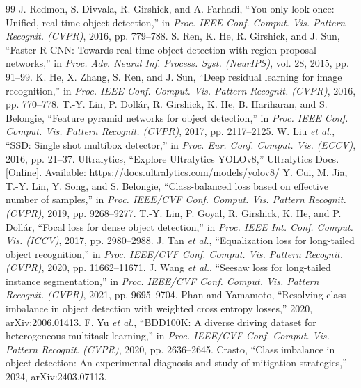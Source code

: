 \documentclass[10pt,journal,letterpaper]{IEEEtran}
\begin{document}
\begin{thebibliography}{99}
 J. Redmon, S. Divvala, R. Girshick, and A. Farhadi, ``You only look once: Unified, real-time object detection,'' in \textit{Proc. IEEE Conf. Comput. Vis. Pattern Recognit. (CVPR)}, 2016, pp. 779--788.
 S. Ren, K. He, R. Girshick, and J. Sun, ``Faster R-CNN: Towards real-time object detection with region proposal networks,'' in \textit{Proc. Adv. Neural Inf. Process. Syst. (NeurIPS)}, vol. 28, 2015, pp. 91--99.
 K. He, X. Zhang, S. Ren, and J. Sun, ``Deep residual learning for image recognition,'' in \textit{Proc. IEEE Conf. Comput. Vis. Pattern Recognit. (CVPR)}, 2016, pp. 770--778.
 T.-Y. Lin, P. Doll\'ar, R. Girshick, K. He, B. Hariharan, and S. Belongie, ``Feature pyramid networks for object detection,'' in \textit{Proc. IEEE Conf. Comput. Vis. Pattern Recognit. (CVPR)}, 2017, pp. 2117--2125.
 W. Liu \textit{et al.}, ``SSD: Single shot multibox detector,'' in \textit{Proc. Eur. Conf. Comput. Vis. (ECCV)}, 2016, pp. 21--37.
 Ultralytics, ``Explore Ultralytics YOLOv8,'' Ultralytics Docs. [Online]. Available: https://docs.ultralytics.com/models/yolov8/
 Y. Cui, M. Jia, T.-Y. Lin, Y. Song, and S. Belongie, ``Class-balanced loss based on effective number of samples,'' in \textit{Proc. IEEE/CVF Conf. Comput. Vis. Pattern Recognit. (CVPR)}, 2019, pp. 9268--9277.
 T.-Y. Lin, P. Goyal, R. Girshick, K. He, and P. Doll\'ar, ``Focal loss for dense object detection,'' in \textit{Proc. IEEE Int. Conf. Comput. Vis. (ICCV)}, 2017, pp. 2980--2988.
 J. Tan \textit{et al.}, ``Equalization loss for long-tailed object recognition,'' in \textit{Proc. IEEE/CVF Conf. Comput. Vis. Pattern Recognit. (CVPR)}, 2020, pp. 11662--11671.
 J. Wang \textit{et al.}, ``Seesaw loss for long-tailed instance segmentation,'' in \textit{Proc. IEEE/CVF Conf. Comput. Vis. Pattern Recognit. (CVPR)}, 2021, pp. 9695--9704.
 Phan and Yamamoto, ``Resolving class imbalance in object detection with weighted cross entropy losses,'' 2020, arXiv:2006.01413.
 F. Yu \textit{et al.}, ``BDD100K: A diverse driving dataset for heterogeneous multitask learning,'' in \textit{Proc. IEEE/CVF Conf. Comput. Vis. Pattern Recognit. (CVPR)}, 2020, pp. 2636--2645.
 Crasto, ``Class imbalance in object detection: An experimental diagnosis and study of mitigation strategies,'' 2024, arXiv:2403.07113.

\end{thebibliography}
\end{document}
